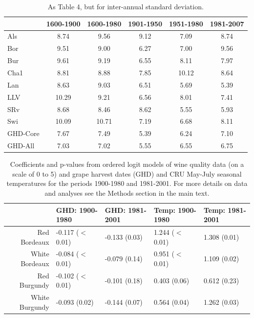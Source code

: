 \documentclass[12pt]{article}
\begin{document}
\begin{table}
\small
\caption{\small As Table 4, but for inter-annual standard deviation.}
\centering
\begin{tabular}{l c c c c c}
\hline
& \bf 1600-1900 & \bf 1600-1980 & \bf 1901-1950 & \bf 1951-1980 & \bf 1981-2007\\
\hline
Als	& 8.74	& 9.56	& 9.12	& 7.09	& 8.74\\
Bor	& 9.51	& 9.00	& 6.27	& 7.00	& 9.56\\
Bur	& 9.61 & 9.19 & 6.55 & 8.11 & 7.97\\
Cha1 & 8.81 & 8.88 & 7.85 & 10.12 & 8.64\\
Lan & 8.63 & 9.03 & 6.51 & 5.69 & 5.39\\
LLV	& 10.29 & 9.21 & 6.56 & 8.01 & 7.41\\
SRv & 8.68 & 8.46 & 8.62 & 5.55 & 5.93\\
Swi	& 10.09	& 10.71	& 7.19	& 6.68	& 8.11\\
\hline
GHD-Core & 7.67 & 7.49 & 5.39 & 6.24 & 7.10\\
GHD-All	& 7.03 & 7.02 & 5.55 & 6.55 & 6.75\\
\hline
\end{tabular}
\end{table}

\begin{table}
\centering
\caption{Coefficients and p-values from ordered logit models of wine quality data (on a scale of 0 to 5) and grape harvest dates (GHD) and CRU May-July seasonal temperatures for the periods 1900-1980 and 1981-2001. For more details on data and analyses see the Methods section in the main text.} 
\begin{tabular}{||r||l|l||l|l||}
  \hline
 & GHD: 1900-1980 & GHD: 1981-2001 & Temp: 1900-1980 & Temp: 1981-2001 \\ 
  \hline
Red Bordeaux & -0.117 ($<$0.01) & -0.133 (0.03) & 1.244 ($<$0.01) & 1.308 (0.01) \\ 
  White Bordeaux & -0.084 ($<$0.01) & -0.079 (0.14) & 0.951 ($<$0.01) & 1.109 (0.02) \\ 
  Red Burgundy & -0.102 ($<$0.01) & -0.101 (0.18) & 0.403 (0.06) & 0.612 (0.23) \\ 
  White Burgundy & -0.093 (0.02) & -0.144 (0.07) & 0.564 (0.04) & 1.262 (0.03) \\ 
   \hline
\end{tabular}
\end{table}%
\end{document}
